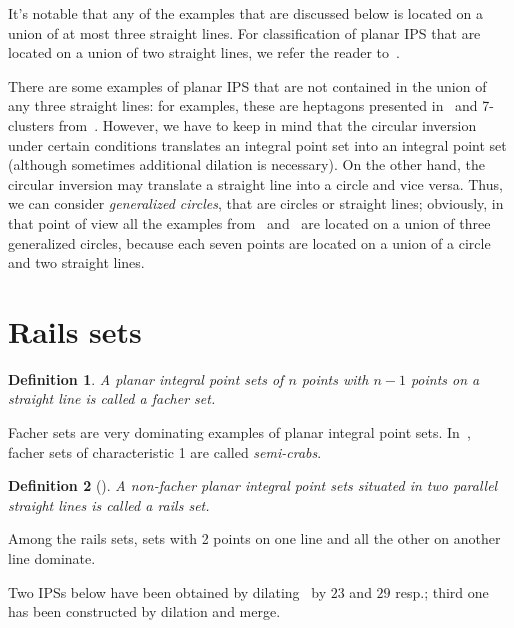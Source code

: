 \documentclass[12pt]{article}
\theoremstyle{theorem}
\theoremstyle{dfn}
\newtheorem{dfn}{Definition}
\theoremstyle{remark}
\begin{document}
It's notable that any of the examples that are discussed below
is located on a union of at most three straight lines.
For classification of planar IPS that are located on a union of two straight lines,
we refer the reader to~\cite{avdeev2019particular}.

There are some examples of planar IPS that are not contained in the union of any three straight lines:
for examples, these are heptagons presented in~\cite{kreisel2008heptagon} and 7-clusters from~\cite{kurz2013constructing}.
However, we have to keep in mind that the circular inversion under certain conditions
translates an integral point set into an integral point set
(although sometimes additional dilation is necessary).
On the other hand, the circular inversion may translate a straight line into a circle and vice versa.
Thus, we can consider \emph{generalized circles}, that are circles or straight lines;
obviously, in that point of view all the examples from~\cite{kreisel2008heptagon} and~\cite{kurz2013constructing}
are located on a union of three generalized circles,
because each seven points are located on a union of a circle and two straight lines.




\section{Rails sets}

\begin{dfn}
	A planar integral point sets of $n$ points with $n-1$ points on a straight line is called
	a \textit{facher} set.
\end{dfn}
Facher sets are very dominating examples of planar integral point sets.
In~\cite{antonov2008maximal}, facher sets of characteristic 1 are called \textit{semi-crabs}.

\begin{dfn}[\cite{avdeev2019particular}]
	A non-facher planar integral point sets situated in two parallel straight lines
	is called a \textit{rails} set.
\end{dfn}

Among the rails sets, sets with 2 points on one line and all the other on another line dominate.


Two IPSs below have been obtained by dilating~\cite[Fig. 34]{avdeev2019particular} by $23$ and $29$  resp.;
third one has been constructed by dilation and merge.
\end{document}
